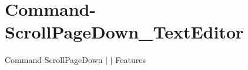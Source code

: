 \chapter{Command-\/\+Scroll\+Page\+Down\+\_\+\+Text\+Editor }
\hypertarget{md__docs_2_text_editor_2_features_2_command-_scroll_page_down___text_editor}{}\label{md__docs_2_text_editor_2_features_2_command-_scroll_page_down___text_editor}
Command-\/\+Scroll\+Page\+Down \texorpdfstring{$\vert$}{|}  \texorpdfstring{$\vert$}{|} Features



 